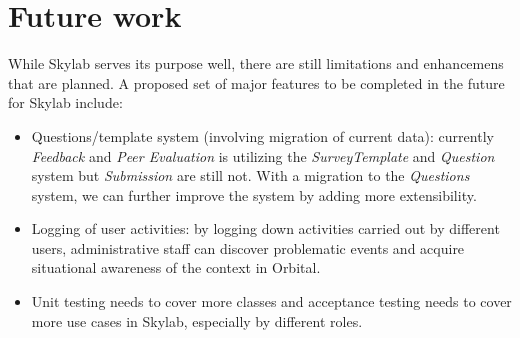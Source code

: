\section{Future work}

While Skylab serves its purpose well, there are still limitations and enhancemens that are planned.  A proposed set of major features to be completed in the future for Skylab include:

\begin{itemize}
  \item Questions/template system (involving migration of current data): currently \textit{Feedback} and \textit{Peer Evaluation} is utilizing the \textit{SurveyTemplate} and \textit{Question} system but \textit{Submission} are still not. With a migration to the \textit{Questions} system, we can further improve the system by adding more extensibility.
  \item Logging of user activities: by logging down activities carried out by different users, administrative staff can discover problematic events and acquire situational awareness of the context in Orbital.
  \item Unit testing needs to cover more classes and acceptance testing needs to cover more use cases in Skylab, especially by different roles.
\end{itemize}


